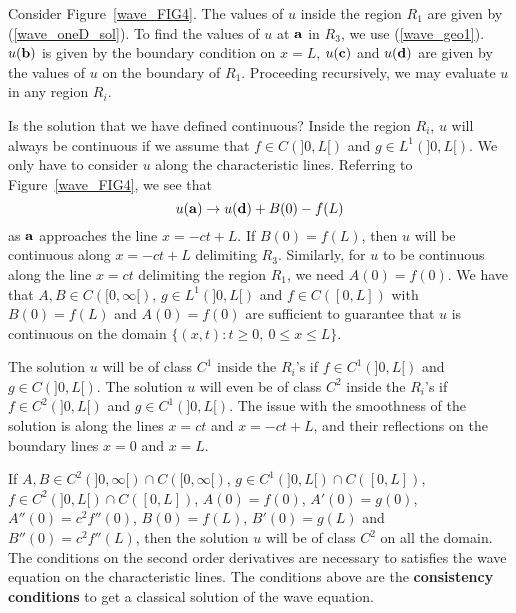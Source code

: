 \begin{egg}
Consider Figure~\ref{wave_FIG4}.  The values of $u$ inside the region
$R_1$ are given by (\ref{wave_oneD_sol}).  To find the values of $u$
at $\mathbf{a}$ in $R_3$, we use (\ref{wave_geo1}).  $u(\mathbf{b})$ is
given by the boundary condition on $x=L$,  $u(\mathbf{c})$ and
$u(\mathbf{d})$ are given by the values of $u$ on the boundary of $R_1$.
Proceeding recursively, we may evaluate $u$ in any region $R_i$.
\label{wave_egg1}


Is the solution that we have defined continuous?  Inside the region
$R_i$, $u$ will always be continuous if we assume that $f\in C(]0,L[)$
and $\displaystyle g\in L^1(]0,L[)$.  We only have to consider $u$ along the
characteristic lines.  Referring to Figure~\ref{wave_FIG4},
we see that
\begin{equation} \label{wave_geo2}
u(\mathbf{a}) \rightarrow u(\mathbf{d}) + B(0) - f(L)
\end{equation}
as $\mathbf{a}$ approaches the line $x=-ct+L$.  If $B(0)=f(L)$, then $u$
will be continuous along $x=-ct+L$ delimiting $R_3$.  Similarly, for
$u$ to be continuous along the line $x=ct$ delimiting the region $R_1$,
we need $A(0)=f(0)$.  We have that
$A,B \in C([0,\infty[)$, $\displaystyle g \in L^1(]0,L[)$ and $f\in C([0,L])$
with $B(0)=f(L)$ and $A(0) = f(0)$ are sufficient to guarantee that
$u$ is continuous on the domain
$\{ (x,t) : t\geq 0, \ 0 \leq x \leq L \}$.

The solution $u$ will be of class $\displaystyle C^1$ inside the $R_i$'s if
$\displaystyle f\in C^1(]0,L[)$ and $g \in C(]0,L[)$.  The solution
$u$ will even be of class $\displaystyle C^2$ inside the $R_i$'s if
$\displaystyle f\in C^2(]0,L[)$ and $\displaystyle g \in C^1(]0,L[)$.
The issue with the smoothness of the solution is along the lines $x= ct$ and
$x=-ct+L$, and their reflections on the boundary lines $x=0$ and $x=L$.

If $\displaystyle A,B \in C^2(]0,\infty[)\cap C([0,\infty[)$,
$\displaystyle g\in C^1(]0,L[)\cap C([0,L])$,
$\displaystyle f\in C^2(]0,L[)\cap C([0,L])$,
$A(0)=f(0)$, $A'(0)=g(0)$, $\displaystyle A''(0)= c^2 f''(0)$, $B(0)=f(L)$,
$B'(0)=g(L)$ and $\displaystyle B''(0)= c^2 f''(L)$, then
the solution $u$ will be of class $\displaystyle C^2$ on all the domain.
The conditions on the second order derivatives are necessary to
satisfies the wave equation on the characteristic lines.
The conditions above are the {\bfseries consistency
conditions} to get a
classical solution of the wave equation.
\end{egg}

